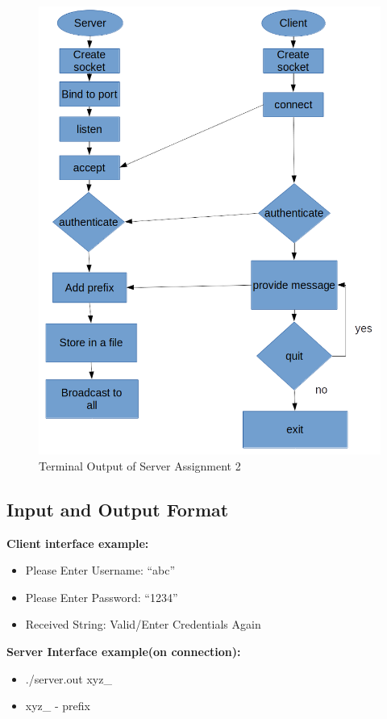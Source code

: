 \documentclass[12pt]{article}
\begin{document}
			\begin{figure}[h!]
				\centering
				\caption{Terminal Output of Server Assignment 2}
				\includegraphics[scale=.55]{flow_2.png}
			\end{figure}
		
		\subsection{Input and Output Format}
			\textbf{Client interface example:}
			\begin{itemize}
				\item Please Enter Username: “abc”
				\item Please Enter Password: “1234”
				\item Received String: Valid/Enter Credentials Again
			 
			\end{itemize}
			\textbf{Server Interface example(on connection):}
			\begin{itemize}
				\item ./server.out xyz\_

				\item  xyz\_ - prefix
				
			\end{itemize}
\end{document}
